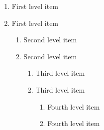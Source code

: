 \begin{enumerate}
  \item First level item
  \item First level item
  \begin{enumerate}
    \item Second level item
    \item Second level item
    \begin{enumerate}
      \item Third level item
      \item Third level item
      \begin{enumerate}
        \item Fourth level item
        \item Fourth level item
      \end{enumerate}
    \end{enumerate}
  \end{enumerate}
\end{enumerate}
